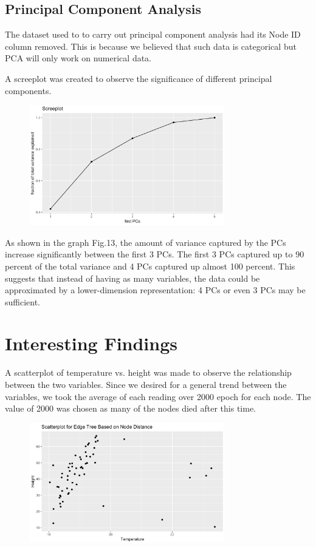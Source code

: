 \documentclass[twocolumn,11pt]{asme2ej}
\begin{document}
\subsection{Principal Component Analysis}

The dataset used to to carry out principal component analysis had its Node ID column removed. This is because we believed that such data is categorical but PCA will only work on numerical data.

A screeplot was created to observe the significance of different principal components. 

\begin{figure}
    \centering
    \includegraphics[width=85mm]{3d.png} 
    \caption{}
    \label{fig:3d}
\end{figure}


As shown in the graph Fig.13, the amount of variance captured by the PCs increase significantly between the first 3 PCs. The first 3 PCs captured up to 90 percent of the total variance and 4 PCs captured up almost 100 percent. This suggests that instead of having as many variables, the data could be approximated by a lower-dimension representation: 4 PCs or even 3 PCs may be sufficient. 

\section{Interesting Findings}

A scatterplot of temperature vs. height was made to observe the relationship between the two variables. Since we desired for a general trend between the variables, we took the average of each reading over 2000 epoch for each node. The value of 2000 was chosen as many of the nodes died after this time.

\begin{figure}
    \centering
    \includegraphics[width=85mm]{4a.png} 
    \caption{}
    \label{fig:4a}
\end{figure}
\end{document}
